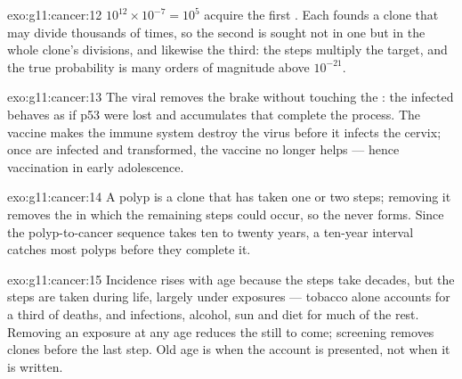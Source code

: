 \begin{solution}{exo:g11:cancer:12}
$10^{12} \times 10^{-7} = 10^5$  acquire the first .
Each founds a clone that may divide thousands of times, so the second
 is sought not in one  but in the whole clone's
divisions, and likewise the third: the steps multiply the target, and
the true probability is many orders of magnitude above $10^{-21}$.
\end{solution}

\begin{solution}{exo:g11:cancer:13}
The viral  removes the brake without touching the : the
infected  behaves as if p53 were lost and accumulates 
that complete the process. The vaccine makes the immune system
destroy the virus before it infects the cervix; once  are
infected and transformed, the vaccine no longer helps --- hence
vaccination in early adolescence.
\end{solution}

\begin{solution}{exo:g11:cancer:14}
A polyp is a clone that has taken one or two steps; removing it
removes the  in which the remaining steps could occur, so the
 never forms. Since the polyp-to-cancer sequence takes ten to
twenty years, a ten-year interval catches most polyps before they
complete it.
\end{solution}

\begin{solution}{exo:g11:cancer:15}
Incidence rises with age because the steps take decades, but the
steps are taken during life, largely under exposures --- tobacco
alone accounts for a third of  deaths, and infections,
alcohol, sun and diet for much of the rest. Removing an exposure at
any age reduces the  still to come; screening removes clones
before the last step. Old age is when the account is presented, not
when it is written.
\end{solution}

